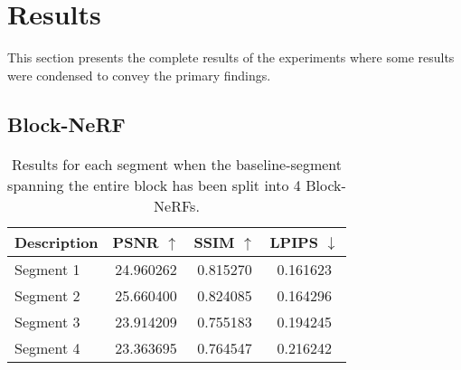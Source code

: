 \begin{comment}
    
Additional material that does not fit in the main thesis but may still be relevant to share, e.g., raw data from experiments and surveys, code listings, additional plots, pre-project reports, project agreements, contracts, logs etc., can be put in appendices. Simply issue the command \texttt{\textbackslash appendix} in the main \texttt{.tex} file, and make one chapter per appendix.

If the appendix is in the form of a ready-made PDF file, it should be supported by a small descriptive text, and included using the \texttt{pdfpages} package. To illustrate how it works, a standard project agreement (for the IE faculty at NTNU in Gjøvik) is attached here. You would probably want the included PDF file to begin on an odd (right hand) page, which is achieved by using the \texttt{\textbackslash cleardoublepage} command immediately before the \texttt{\textbackslash includepdf[]\{\}} command. Use the option \texttt{[pages=-]} to include all pages of the PDF document, or, e.g., \texttt{[pages=2-4]} to include only the given page range.

\cleardoublepage

\end{comment}







\clearpage
\section{Results}
This section presents the complete results of the experiments where some results were condensed to convey the primary findings.

\subsection{Block-NeRF}

\begin{table}[H]
\centering
\setlength{\tabcolsep}{6pt}
\renewcommand{\arraystretch}{1.5}
\begin{tabular}{l | C{2.2} C{1.3} C{1.3}}
\hline
\textbf{Description} & \textbf{PSNR $\uparrow$} & \textbf{SSIM $\uparrow$} & \textbf{LPIPS $\downarrow$} \\
\hline
Segment 1 & 24.960262 & 0.815270 & 0.161623 \\
Segment 2 & 25.660400 & 0.824085 & 0.164296 \\
Segment 3 & 23.914209 & 0.755183 & 0.194245 \\
Segment 4 & 23.363695 & 0.764547 & 0.216242 \\
\hline
\end{tabular}
\caption{Results for each segment when the baseline-segment spanning the entire block has been split into 4 Block-NeRFs.}
\label{tab:block-nerf-four-segments-full}
\end{table}


